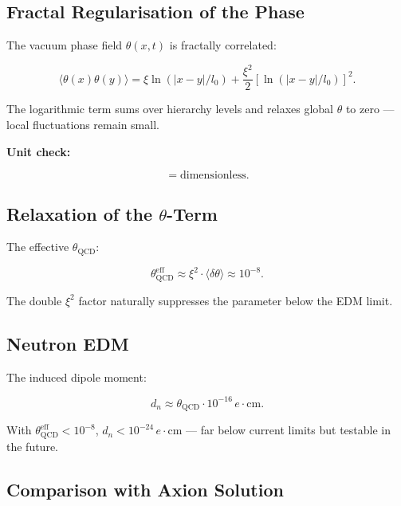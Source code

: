 	\subsection*{Fractal Regularisation of the Phase}
	
	The vacuum phase field \(\theta(x,t)\) is fractally correlated:
	
	\begin{equation}
		\langle \theta(x) \theta(y) \rangle = \xi \ln(|x-y|/l_0) + \frac{\xi^2}{2} [\ln(|x-y|/l_0)]^2.
	\end{equation}
	
	The logarithmic term sums over hierarchy levels and relaxes global \(\theta\) to zero — local fluctuations remain small.
	
	\textbf{Unit check:}
	
	\begin{equation}
		[\langle \theta \theta \rangle] = \text{dimensionless}.
	\end{equation}
	
	\subsection*{Relaxation of the \(\theta\)-Term}
	
	The effective \(\theta_{\text{QCD}}\):
	
	\begin{equation}
		\theta_{\text{QCD}}^{\text{eff}} \approx \xi^2 \cdot \langle \delta \theta \rangle \approx 10^{-8}.
	\end{equation}
	
	The double \(\xi^2\) factor naturally suppresses the parameter below the EDM limit.
	
	\subsection*{Neutron EDM}
	
	The induced dipole moment:
	
	\begin{equation}
		d_n \approx \theta_{\text{QCD}} \cdot 10^{-16} \, e \cdot \text{cm}.
	\end{equation}
	
	With \(\theta_{\text{QCD}}^{\text{eff}} < 10^{-8}\), \(d_n < 10^{-24} \, e \cdot \text{cm}\) — far below current limits but testable in the future.
	
	\subsection*{Comparison with Axion Solution}
	
